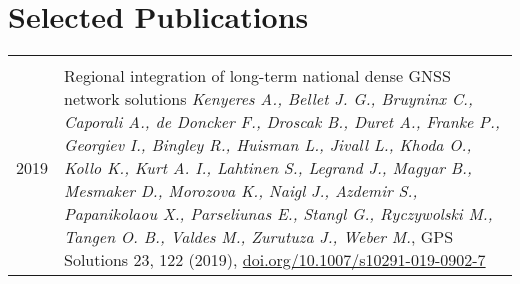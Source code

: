 \documentclass[8pt]{extarticle} %
\begin{document}
\section*{Selected Publications}

\begin{longtable}{r|p{14cm}}
%
\multicolumn{2}{c}{} \\
  \textsc{2019}
%
  & Regional integration of long-term national dense GNSS network solutions
  \emph{Kenyeres A., Bellet J. G., Bruyninx C., Caporali A., de Doncker F., Droscak B., Duret A., Franke P., Georgiev I., Bingley R., Huisman L., Jivall L., Khoda O., Kollo K., Kurt A. I., Lahtinen S., Legrand J., Magyar B., Mesmaker D., Morozova K., Naigl J., Azdemir S., Papanikolaou X., Parseliunas E., Stangl G., Ryczywolski M., Tangen O. B., Valdes M., Zurutuza J., Weber M.}, GPS Solutions 23, 122 (2019), \href{https://doi.org/10.1007/s10291-019-0902-7}{doi.org/10.1007/s10291-019-0902-7}\\


\end{longtable}
\end{document}
